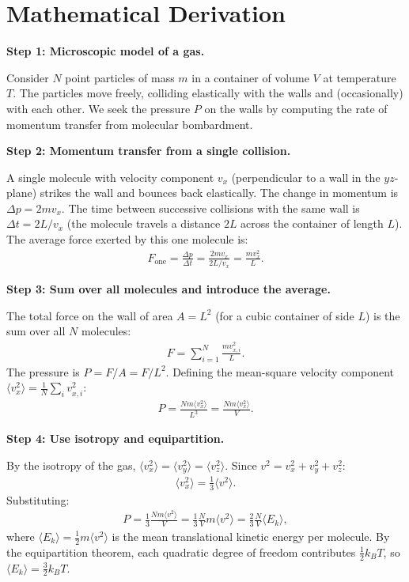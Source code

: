 \section*{Mathematical Derivation}

\textbf{Step 1: Microscopic model of a gas.}

Consider $N$ point particles of mass $m$ in a container of volume $V$ at temperature $T$. The particles move freely, colliding elastically with the walls and (occasionally) with each other. We seek the pressure $P$ on the walls by computing the rate of momentum transfer from molecular bombardment.

\textbf{Step 2: Momentum transfer from a single collision.}

A single molecule with velocity component $v_x$ (perpendicular to a wall in the $yz$-plane) strikes the wall and bounces back elastically. The change in momentum is $\Delta p = 2mv_x$. The time between successive collisions with the same wall is $\Delta t = 2L/v_x$ (the molecule travels a distance $2L$ across the container of length $L$). The average force exerted by this one molecule is:
\begin{align}
F_{\text{one}} = \frac{\Delta p}{\Delta t} = \frac{2mv_x}{2L/v_x} = \frac{mv_x^2}{L}.
\end{align}

\textbf{Step 3: Sum over all molecules and introduce the average.}

The total force on the wall of area $A = L^2$ (for a cubic container of side $L$) is the sum over all $N$ molecules:
\begin{align}
F = \sum_{i=1}^{N}\frac{mv_{x,i}^2}{L}.
\end{align}
The pressure is $P = F/A = F/L^2$. Defining the mean-square velocity component $\langle v_x^2\rangle = \frac{1}{N}\sum_i v_{x,i}^2$:
\begin{align}
P = \frac{N m\langle v_x^2\rangle}{L^3} = \frac{Nm\langle v_x^2\rangle}{V}.
\end{align}

\textbf{Step 4: Use isotropy and equipartition.}

By the isotropy of the gas, $\langle v_x^2\rangle = \langle v_y^2\rangle = \langle v_z^2\rangle$. Since $v^2 = v_x^2 + v_y^2 + v_z^2$:
\begin{align}
\langle v_x^2\rangle = \frac{1}{3}\langle v^2\rangle.
\end{align}
Substituting:
\begin{align}
P = \frac{1}{3}\frac{Nm\langle v^2\rangle}{V} = \frac{1}{3}\frac{N}{V}m\langle v^2\rangle = \frac{2}{3}\frac{N}{V}\langle E_k\rangle,
\end{align}
where $\langle E_k\rangle = \frac{1}{2}m\langle v^2\rangle$ is the mean translational kinetic energy per molecule. By the equipartition theorem, each quadratic degree of freedom contributes $\frac{1}{2}k_BT$, so $\langle E_k\rangle = \frac{3}{2}k_BT$.

